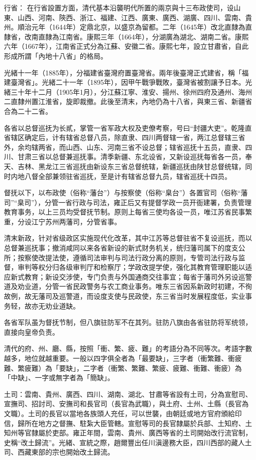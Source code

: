 行省：
在行省設置方面，清代基本沿襲明代所置的兩京與十三布政使司，设山東、山西、河南、陝西、浙江、福建、江西、廣東、廣西、湖廣、四川、雲南、貴州。順治元年（1644年）定鼎北京，以盛京為留都。二年（1645年）改北直隸為直隸省，改南直隸為江南省。康熙三年（1664年），分湖廣為湖北、湖南二省。康熙六年（1667年），江南省正式分為江蘇、安徽二省。康熙七年，設立甘肅省，自此形成所謂「內地十八省」的格局。

光緒十一年（1885年），分福建省臺灣府置臺灣省。兩年後臺灣正式建省，稱「福建臺灣省」。光緒二十一年（1895年），因甲午戰爭戰敗，臺灣省被割讓予日本。光緒三十年十二月（1905年1月），分江蘇江寧、淮安、揚州、徐州四府及通州、海州二直隸州置江淮省，旋即裁撤。此後至清末，內地仍為十八省，與東三省、新疆省合為二十二省。

各省以总督巡抚为长貳，掌管一省军政大权及吏僚考察，号曰“封疆大吏”。乾隆直省辖区确定后，计有辖省总督八员，除直隶、四川两督辖一省，两江总督辖三省外，余均辖两省，而山西、山东、河南三省不设总督；辖省巡抚十五员，直隶、四川、甘肃三省以总督兼巡抚事。清季新疆、东北设省，又新设巡抚每省各一员，奉天、吉林、黑龙江三省巡抚由新设东三省总督统辖，新疆巡抚由陕甘总督统辖，同时内地八督全部兼领驻省巡抚，至是计有辖省总督九员，辖省巡抚十四员。

督抚以下，以布政使（俗称“藩台”）与按察使（俗称“臬台”）各置官司（俗称“藩司”“臬司”），分管一省行政与司法，雍正后又有提督学政一员开衙建署，负责管理教育事务，以上三员均受督抚节制。原则上每省三使均各设一员，唯江苏省民事繁重，分设江宁苏州两藩司，分管省事。

清末新政，针对省级政区实施现代化改革，其中江苏等总督驻省不复设巡抚，而以总督兼巡抚事；撤消咸同以来各省新设的新式财务机关，统归藩司属下的度支公所；按察使改提法使，遵循司法审判与司法行政分离的原则，专管司法行政与监督，审判等权分归各级审判厅和检察厅；学政改提学使，强化其教育管理职能以适应新式教育；新设交涉使，专门负责与外国通商交往事宜；每省于藩司外另设巡警道及劝业道，分管一省民政警务与农工商业事务。唯东三省因系新政时初建，不徇故例，故无藩司及巡警道，而设度支使与民政使，东三省当时发展程度低，实业事务轻，故亦无劝业道缺。

各省军队虽为督抚节制，但八旗驻防军不在其列。驻防八旗由各省驻防将军统领，直接向皇帝负责。

清代的府、州、廳、縣，按照「衝、繁、疲、難」的考語分為不同等次。考語字數越多，地位就越重要。一般以四字俱全者為「最要缺」，三字者（衝繁難、衝疲難、繁疲難）為「要缺」，二字者（衝繁、繁難、繁疲、疲難、衝難、衝疲）為「中缺」、一字或無字者為「簡缺」。

土司：雲南、貴州、廣西、四川、湖南、湖北、甘肅等省設有土司，分為宣慰司、宣撫司、招討司、安撫司和長官司（長官為武職），與土府、土州、土縣（長官為文職）。土司的長官以當地各族頭人充任，可以世襲，由朝廷或地方官府頒給印信，歸所在地方之督撫、駐紮大臣管轄。宣慰等司的長官隸屬於兵部、土知府、土知州等官隸屬於吏部。雍正年間，雲南、貴州、廣西等省的土司開始改行流官制，史稱“改土歸流”。光緒、宣統之際，趙爾豐出任川滇邊務大臣，四川西部的藏人土司、西藏東部的宗也開始改土歸流。

